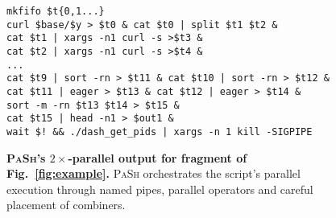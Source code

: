 \documentclass[sigplan, review, screen, anonymous]{acmart}
\newcommand{\sys}{{\scshape PaSh}\xspace}
\begin{document}

\begin{figure}[t]
\centering
\begin{verbatim}
mkfifo $t{0,1...}
curl $base/$y > $t0 & cat $t0 | split $t1 $t2 &
cat $t1 | xargs -n1 curl -s >$t3 & 
cat $t2 | xargs -n1 curl -s >$t4 &
...
cat $t9 | sort -rn > $t11 & cat $t10 | sort -rn > $t12 &
cat $t11 | eager > $t13 & cat $t12 | eager > $t14 &
sort -m -rn $t13 $t14 > $t15 &
cat $t15 | head -n1 > $out1 &
wait $! && ./dash_get_pids | xargs -n 1 kill -SIGPIPE
\end{verbatim}
\caption{
  \textbf{\sys's $2\times$-parallel output for fragment of Fig.~\ref{fig:example}.}
  \sys orchestrates the script's parallel execution through named pipes, parallel operators and careful placement of combiners.
}
\vspace{-15pt}
\label{fig:example2}
\end{figure}
\end{document}
